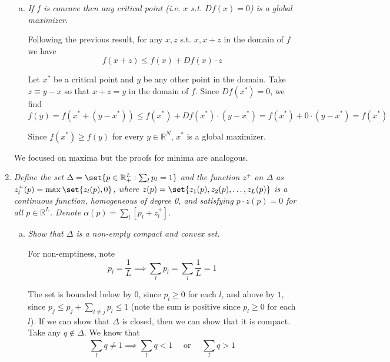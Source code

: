 \documentclass{article}
\begin{document}
\begin{enumerate}[1.]
\begin{enumerate}[a)]
      \item \textit{If $f$ is concave then any critical point (i.e. $x$ s.t. $Df(x) = 0$) is a global maximizer.}

        \solution Following the previous result, for any $x, z$ s.t. $x, x + z$ in the domain of $f$ we have
        \[
          f(x + z) \le f(x) + D f(x) \cdot z
        \]

        Let $x^*$ be a critical point and $y$ be any other point in the domain. Take $z \equiv y - x$ so that $x + z = y$ in the domain of $f$. Since $D f(x^*) = 0$, we find
        \[
          f(y)
          =
          f(x^* + (y - x^*))
          \le f(x^*) + D f(x^*) \cdot (y - x^*)
          = f(x^*) + 0 \cdot (y - x^*)
          = f(x^*)
        \]

        Since $f(x^*) \ge f(y)$ for every $y \in \mathbb{R}^N$, $x^*$ is a global maximizer.
    \end{enumerate}

    \begin{remark}
      We focused on maxima but the proofs for minima are analogous.
    \end{remark}

  \item {\itshape
    Define the set $\Delta = \set{p \in \mathbb{R}^L_{+}: \sum^{}_{l} p_l = 1}$ and the function $z^+$ on $\Delta$ as $z^+_l(p) = \max\set{z_l(p), 0}$, where $z(p) = \set{z_1(p), z_2(p), \ldots, z_L(p)}$ is a continuous function, homogeneous of degree 0, and satisfying $p \cdot z(p) = 0$ for all $p \in \mathbb{R}^L$. Denote $\alpha(p) = \sum^{}_{l} \left[p_l + z_l^+\right]$.}

    \begin{enumerate}[a)]
      \item \textit{Show that $\Delta$ is a non-empty compact and convex set.}

        \solution For non-emptiness, note
        \[
          p_l = \dfrac{1}{L}
          \implies
          \sum_l p_l = \sum^{}_{l} \dfrac{1}{L} = 1
        \]

        The set is bounded below by $0$, since $p_l \ge 0$ for each $l$, and above by $1$, since $p_j \le p_j + \sum^{}_{l \ne j} p_l \le 1$ (note the sum is positive since $p_l \ge 0$ for each $l$). If we can show that $\Delta$ is closed, then we can show that it is compact. Take any $q \notin \Delta$. We know that
        \[
          \sum^{}_{l} q \ne 1
          \implies
          \sum^{}_{l} q < 1
          \quad
          \text{ or }
          \quad
          \sum^{}_{l} q > 1
        \]


\end{enumerate}
\end{enumerate}
\end{document}
